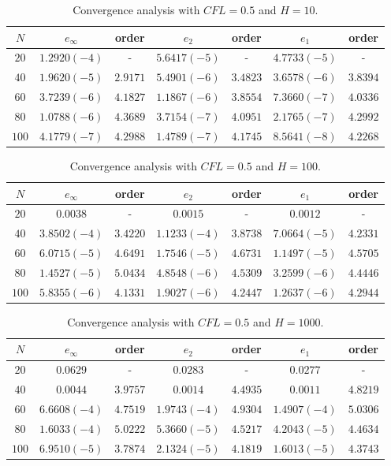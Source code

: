 \documentclass[10pt,a4paper]{amsart}
\begin{document}
\begin{table}%
\begin{tabular}{c|c|c|c|c|c|c}
$N$ & $e_{\infty}$ & order & $e_2$ & order & $e_1$ & order \\ 
\hline 
\hline
$20$ & $1.2920 (-4)$ & - & $5.6417 (-5)$ & - & $4.7733 (-5)$ & - \\ 
\hline 
$40$ & $1.9620 (-5)$ & $2.9171$ & $5.4901 (-6)$ & $3.4823$ & $3.6578 (-6)$ & $3.8394$ \\ 
\hline 
$60$ & $3.7239 (-6)$ & $4.1827$ & $1.1867 (-6)$ & $3.8554$ & $7.3660 (-7)$ & $4.0336$ \\
\hline 
$80$ & $1.0788 (-6)$ & $4.3689$ & $3.7154 (-7)$ & $4.0951$ & $2.1765 (-7)$ & $4.2992$ \\ 
\hline 
$100$ & $4.1779(-7)$ & $4.2988$ & $1.4789 (-7)$ & $4.1745$ & $8.5641 (-8)$ & $4.2268$  \\ 
\end{tabular} 
\caption{Convergence analysis with $CFL=0.5$ and $H=10$.}
\label{CV_order4_hp10}
\end{table}

\begin{table}%
\begin{tabular}{c|c|c|c|c|c|c}
$N$ & $e_{\infty}$ & order & $e_2$ & order & $e_1$ & order \\ 
\hline 
\hline
$20$ & $0.0038$ & - & $0.0015$ & - & $0.0012$ & - \\ 
\hline 
$40$ & $3.8502 (-4)$ & $3.4220$ & $1.1233 (-4)$ & $3.8738$ & $7.0664 (-5)$ & $4.2331$ \\ 
\hline 
$60$ & $6.0715 (-5)$ & $4.6491$ & $1.7546 (-5)$ & $4.6731$ & $1.1497 (-5)$ & $4.5705$ \\
\hline 
$80$ & $1.4527 (-5)$ & $5.0434$ & $4.8548 (-6)$ & $4.5309$ & $3.2599 (-6)$ & $4.4446$ \\ 
\hline 
$100$ & $5.8355(-6)$ & $4.1331$ & $1.9027 (-6)$ & $4.2447$ & $1.2637 (-6)$ & $4.2944$  \\ 
\end{tabular} 
\caption{Convergence analysis with $CFL=0.5$ and $H=100$.}
\label{CV_order4_hp100}
\end{table}

\begin{table}%
\begin{tabular}{c|c|c|c|c|c|c}
$N$ & $e_{\infty}$ & order & $e_2$ & order & $e_1$ & order \\ 
\hline 
\hline
$20$ & $0.0629$ & - & $0.0283$ & - & $0.0277$ & - \\ 
\hline 
$40$ & $0.0044$ & $3.9757$ & $0.0014$ & $4.4935$ & $0.0011$ & $4.8219$ \\ 
\hline 
$60$ & $6.6608 (-4)$ & $4.7519$ & $1.9743 (-4)$ & $4.9304$ & $1.4907 (-4)$ & $5.0306$ \\
\hline 
$80$ & $1.6033 (-4)$ & $5.0222$ & $5.3660 (-5)$ & $4.5217$ & $4.2043 (-5)$ & $4.4634$ \\ 
\hline 
$100$ & $6.9510(-5)$ & $3.7874$ & $2.1324 (-5)$ & $4.1819$ & $1.6013 (-5)$ & $4.3743$  \\ 
\end{tabular} 
\caption{Convergence analysis with $CFL=0.5$ and $H=1000$.}
\label{CV_order4_hp1000}
\end{table}
\end{document}
